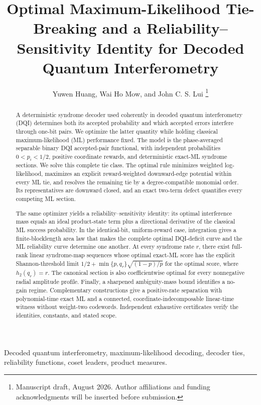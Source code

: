 \documentclass[journal]{IEEEtran}
\title{Optimal Maximum-Likelihood Tie-Breaking and a Reliability--Sensitivity Identity for Decoded Quantum Interferometry}
\author{Yuwen Huang, Wai Ho Mow, and John C. S. Lui%
\thanks{Manuscript draft, August 2026. Author affiliations and funding acknowledgments will be inserted before submission.}}
\theoremstyle{definition}
\theoremstyle{remark}
\begin{document}
\maketitle

\begin{abstract}
A deterministic syndrome decoder used coherently in decoded quantum
interferometry (DQI) determines both its accepted probability and which
accepted errors interfere through one-bit pairs.  We optimize the latter
quantity while holding classical maximum-likelihood (ML) performance fixed.
The model is the phase-averaged separable binary DQI accepted-pair functional,
with independent probabilities $0<p_i<1/2$, positive coordinate rewards, and
deterministic exact-ML syndrome sections.  We solve this complete tie class.
The optimal rule minimizes weighted log-likelihood, maximizes an explicit
reward-weighted downward-edge potential within every ML tie, and resolves the
remaining tie by a degree-compatible monomial order.  Its representatives are
downward closed, and an exact two-term defect quantifies every competing ML
section.

The same optimizer yields a reliability--sensitivity identity: its optimal
interference mass equals an ideal product-state term plus a directional
derivative of the classical ML success probability.  In the identical-bit,
uniform-reward case, integration gives a finite-blocklength area law that
makes the complete optimal DQI-deficit curve and the ML reliability curve
determine one another.  At every syndrome rate $r$, there exist full-rank
linear syndrome-map sequences whose optimal exact-ML score has the explicit
Shannon-threshold limit
$1/2+\min\{p,q_r\}\sqrt{(1-p)/p}$ for the optimal score, where
$h_2(q_r)=r$.  The canonical section is also coefficientwise optimal
for every nonnegative radial amplitude profile.  Finally, a sharpened
ambiguity-mass bound identifies a no-gain regime.  Complementary constructions
give a positive-rate separation with polynomial-time exact ML and a connected,
coordinate-indecomposable linear-time witness without weight-two codewords.
Independent exhaustive
certificates verify the identities, constants, and stated scope.
\end{abstract}

\begin{IEEEkeywords}
Decoded quantum interferometry, maximum-likelihood decoding, decoder ties,
reliability functions, coset leaders, product measures.
\end{IEEEkeywords}
\end{document}
